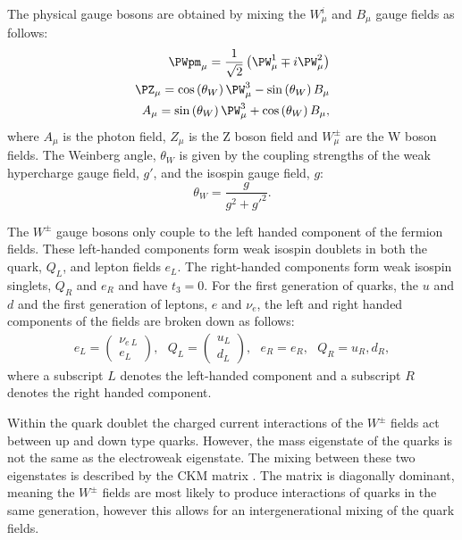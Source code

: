 The physical gauge bosons are obtained by mixing the $W_{\mu}^i$ and $B_{\mu}$ gauge
fields as follows:
\begin{equation}
  \begin{split}
  \PWpm_{\mu}=\frac{1}{\sqrt{2}}\left(\PW^{1}_{\mu}\mp i\PW^{2}_{\mu}\right) \\
  \PZ_{\mu}=\cos\left(\theta_{W}\right)\PW^{3}_{\mu}-\sin\left(\theta_{W}\right)B_{\mu} \\
  A_{\mu}=\sin\left(\theta_{W}\right)\PW^{3}_{\mu}+\cos\left(\theta_{W}\right)B_{\mu},
  \end{split}
\end{equation}
where $A_{\mu}$ is the photon field, $Z_{\mu}$ is the Z boson field
and $W^{\pm}_{\mu}$ are the W boson fields. The Weinberg angle,
$\theta_W$ is given by the coupling strengths of the weak hypercharge
gauge field, $g'$, and the isospin gauge field, $g$:
\begin{equation}
\theta_W = \frac{g}{g^2+g'^2}.
\end{equation}

The $W^{\pm}$ gauge bosons only couple to the left handed component of
the fermion fields. These left-handed components form weak isospin
doublets in both the quark, $Q_L$, and lepton fields $e_L$. The
right-handed components form weak isospin singlets, $Q_R$ and $e_R$
and have $t_3=0$. For the first generation of quarks, the $u$ and $d$
and the first generation of leptons, $e$ and $\nu_e$, the left and
right handed components of the fields are broken down as follows:
\begin{equation}
  \begin{split}
  e_L=\left(\begin{array}{c} \nu_{e~L} \\
  e_L\end{array}\right),~~~
  Q_L=\left(\begin{array}{c} u_L \\
  d_L\end{array}\right),~~~e_R=e_R,~~~Q_R=u_R,d_R,
  \end{split}
\end{equation}
where a subscript $L$ denotes the left-handed component and a
subscript $R$ denotes the right handed component.

Within the quark doublet the charged current interactions of the
$W^{\pm}$ fields act between up and down type quarks. However, the
mass eigenstate of the quarks is not the same as the electroweak
eigenstate. The mixing between these two eigenstates is described by
the \ac{CKM} matrix \cite{Kobayashi:1973fv}. The matrix is diagonally
dominant, meaning the $W^{\pm}$ fields are most likely to produce
interactions of quarks in the same generation, however this allows for
an intergenerational mixing of the quark fields.


